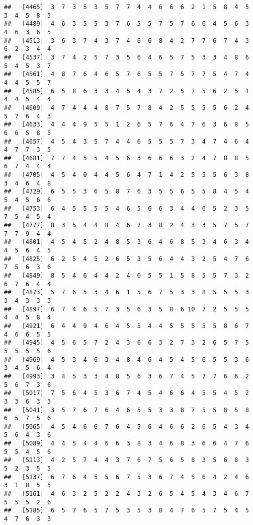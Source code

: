 \documentclass[
]{book}
\begin{document}
\begin{verbatim}
##   [4465]  3  7  3  5  3  5  7  7  4  4  6  6  6  2  1  5  8  4  5  3  4  5  8  5
##   [4489]  4  6  3  5  5  3  7  6  5  5  7  5  7  6  6  4  5  6  3  4  6  3  6  5
##   [4513]  3  6  3  7  4  3  7  4  6  6  8  4  2  7  7  6  7  4  3  6  2  3  4  4
##   [4537]  3  7  4  2  5  7  3  5  6  4  6  5  7  5  3  3  4  8  6  5  4  5  3  7
##   [4561]  4  8  7  6  4  6  5  7  6  5  5  7  5  7  7  5  4  7  4  4  4  5  5  7
##   [4585]  6  5  8  6  3  3  4  5  4  3  7  2  5  7  5  6  2  5  1  4  4  5  4  4
##   [4609]  4  7  4  4  4  8  7  5  7  8  4  2  5  5  5  5  6  2  4  5  7  6  4  3
##   [4633]  4  4  4  9  5  5  1  2  6  5  7  6  4  7  6  3  6  8  5  6  6  5  8  5
##   [4657]  4  5  4  3  5  7  4  4  6  5  5  5  7  3  4  7  4  6  4  4  7  7  3  5
##   [4681]  7  7  4  5  5  4  5  6  3  6  6  6  3  2  4  7  8  8  5  6  7  4  4  4
##   [4705]  4  5  4  0  4  4  5  6  4  7  1  4  2  5  5  5  6  3  8  3  4  6  4  8
##   [4729]  6  5  5  3  6  5  8  7  6  3  5  5  6  5  5  8  4  5  4  5  4  5  6  6
##   [4753]  6  4  5  5  5  5  4  6  5  6  6  3  4  4  6  5  2  3  5  7  5  4  5  4
##   [4777]  8  3  5  4  4  8  4  6  7  3  8  2  4  3  3  5  7  5  7  7  7  9  4  4
##   [4801]  4  5  4  5  2  4  8  5  3  6  4  6  8  5  3  4  6  3  4  4  5  6  4  5
##   [4825]  6  2  5  4  5  2  6  5  3  5  6  4  4  3  2  5  4  7  6  7  5  6  3  6
##   [4849]  8  5  4  6  4  4  2  4  6  5  5  1  5  8  5  5  7  3  2  6  7  6  4  4
##   [4873]  5  7  6  5  3  4  6  1  5  6  7  5  3  3  8  5  5  5  3  3  4  3  3  3
##   [4897]  6  7  4  6  5  7  3  5  6  3  5  8  6 10  7  2  5  5  5  4  4  5  8  4
##   [4921]  6  4  4  9  4  6  4  5  5  4  4  5  5  5  5  5  8  6  7  4  6  6  5  5
##   [4945]  4  5  6  5  7  2  4  3  6  6  3  2  7  3  2  6  5  7  5  5  5  5  5  6
##   [4969]  4  5  3  4  6  3  4  8  4  6  4  5  4  5  6  5  5  3  6  3  4  5  6  4
##   [4993]  3  4  5  3  3  4  8  5  6  3  6  7  4  5  7  7  6  6  2  5  6  7  3  6
##   [5017]  7  5  6  4  5  3  6  7  4  5  4  6  6  4  5  5  4  5  2  3  3  6  3  3
##   [5041]  3  5  7  6  7  6  4  6  5  5  3  3  8  7  5  5  8  5  8  6  5  7  5  6
##   [5065]  4  5  4  6  6  7  6  4  5  6  4  6  6  2  6  5  4  3  4  5  6  4  3  6
##   [5089]  4  4  5  4  4  6  6  3  8  3  4  6  8  3  6  6  4  7  6  5  5  4  5  6
##   [5113]  4  2  5  7  4  4  3  7  6  7  5  6  5  8  3  5  6  8  3  5  2  3  5  5
##   [5137]  6  7  6  4  5  5  6  7  5  3  6  7  4  5  6  4  2  4  6  3  1  8  5  5
##   [5161]  4  6  3  2  5  2  2  4  3  2  6  5  4  5  4  3  4  6  7  5  5  5  2  6
##   [5185]  6  5  7  6  5  7  5  3  5  3  8  4  7  6  5  7  5  4  5  4  7  6  3  3

\end{verbatim}
\end{document}
